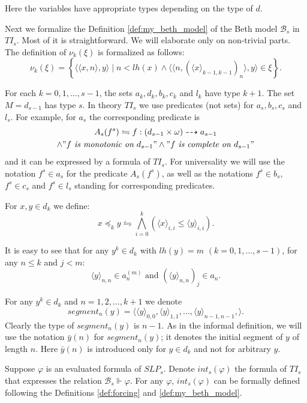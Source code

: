 \documentclass{asl}
\theoremstyle{definition}
\begin{document}
Here the variables have appropriate types depending on the type of $d$. 

Next we formalize the Definition \ref{def:my_beth_model} of the Beth model $\mathcal{B}_s$ in $TI_s$. Most of it is straightforward. We will elaborate only on non-trivial parts. The definition of $\nu_k(\xi)$ is formalized as follows:
\[\nu_k(\xi)=\left\lbrace \langle\langle x,n\rangle, y\rangle \mid n<lh(x) \wedge \langle\langle n,\left( \langle x \rangle_{k-1,k-1}\right)_n\rangle, y \rangle \in \xi\right\rbrace. \]

For each $k=0,1,\ldots,s-1$, the sets $a_k,d_k,b_k,c_k$ and $l_k$ have type $k+1$. The set $M=d_{s-1}$ has type $s$. In theory $TI_s$ we use predicates (not sets) for 
$a_s,b_s,c_s$ and $l_s$. For example, for $a_s$ the corresponding predicate is 
\begin{multline*}
A_s(f^s)\leftrightharpoons f:\left(d_{s-1}\times \omega \right)\dashrightarrow a_{s-1}
\\
\wedge "f \textit{ is monotonic on }d_{s-1}"\wedge "f \textit{ is complete on }d_{s-1}"
\end{multline*}
and it can be expressed by a formula of $TI_s$. For universality we will use the notation $f^s\in a_s$ for the predicate $A_s(f^s)$, as well as the notations $f^s\in b_s$, $f^s\in c_s$ and $f^s\in l_s$  standing for corresponding predicates. 

For $x,y\in d_k$ we define: 
\[x\preceq_k y \leftrightharpoons \bigwedge_{i=0}^k \left(\langle x\rangle_{i,i}\leqslant \langle y\rangle_{i,i} \right). \]

It is easy to see that for any $y^k\in d_k$ with $lh(y)=m$ $(k=0,1,\ldots,s-1)$, for any $n\leqslant k$ and $j<m$:
\[\langle y\rangle_{n,n}\in a_n^{(m)} \text{ and }\left( \langle y\rangle_{n,n}\right)_j \in a_n.\]

For any $y^k \in d_k$ and $n=1,2,\ldots,k+1$ we denote 
\[segment_n(y)=\langle\langle y\rangle_{0,0},\langle y\rangle_{1,1},\ldots,\langle y\rangle_{n-1,n-1},\rangle.\]
Clearly the type of $segment_n(y)$ is $n-1$. As in the informal definition, we will use the notation $\bar{y}(n)$ for $segment_n(y)$; it denotes the initial segment of $y$ of length $n$. Here $\bar{y}(n)$ is introduced only for $y\in d_k$ and not for arbitrary $y$. 

Suppose $\varphi$ is an evaluated formula of $SLP_s$. Denote $int_s(\varphi)$ the formula of $TI_s$ that expresses the relation $\mathcal{B}_s\Vdash \varphi$. For any $\varphi$, $int_s(\varphi)$ can be formally defined following the Definitions \ref{def:forcing} and \ref{def:my_beth_model}. 
\end{document}
